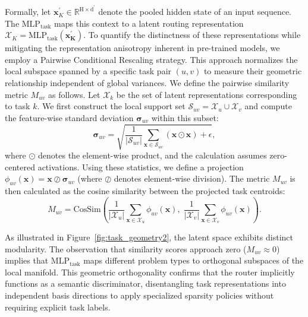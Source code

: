 Formally, let $\boldsymbol{x}_K^{\prime} \in \mathbb{R}^{\mathrm{H \times d^{\prime}}}$ denote the pooled hidden state of an input sequence. 
The $\text{MLP}_{\text{task}}$ maps this context to a latent routing representation $\mathcal{X}_K = \text{MLP}_{\text{task}}(\mathbf{\boldsymbol{x}_K^{\prime}})$. To quantify the distinctness of these representations while mitigating the representation anisotropy inherent in pre-trained models, we employ a Pairwise Conditional Rescaling strategy. This approach normalizes the local subspace spanned by a specific task pair $(u, v)$ to measure their geometric relationship independent of global variances.
We define the pairwise similarity metric $M_{uv}$ as follows. Let $\mathcal{X}_k$ be the set of latent representations corresponding to task $k$. 
We first construct the local support set $\mathcal{S}_{uv} = \mathcal{X}_u \cup \mathcal{X}_v$ and compute the feature-wise standard deviation $\boldsymbol{\sigma}_{uv}$ within this subset:
\begin{equation}
    \boldsymbol{\sigma}_{uv} = \sqrt{ \frac{1}{|\mathcal{S}_{uv}|} \sum_{\mathbf{x} \in \mathcal{S}_{uv}} (\mathbf{x} \odot \mathbf{x}) + \epsilon },
\end{equation}
where $\odot$ denotes the element-wise product, and the calculation assumes zero-centered activations.
Using these statistics, we define a projection $\phi_{uv}(\mathbf{x}) = \mathbf{x} \oslash \boldsymbol{\sigma}_{uv}$ (where $\oslash$ denotes element-wise division). 
The metric $M_{uv}$ is then calculated as the cosine similarity between the projected task centroids:
\begin{equation}
    M_{uv} = \mathrm{CosSim}\left( \frac{1}{|\mathcal{X}_u|} \sum_{\mathbf{x} \in \mathcal{X}_u} \phi_{uv}(\mathbf{x}), \; \frac{1}{|\mathcal{X}_v|} \sum_{\mathbf{x} \in \mathcal{X}_v} \phi_{uv}(\mathbf{x}) \right).
\end{equation}

As illustrated in Figure~\ref{fig:task_geometry2}, the latent space exhibits distinct modularity. The observation that similarity scores approach zero ($M_{uv} \approx 0$) implies that $\text{MLP}_{\text{task}}$ maps different problem types to orthogonal subspaces of the local manifold.  This geometric orthogonality confirms that the router implicitly functions as a semantic discriminator, disentangling task representations into independent basis directions to apply specialized sparsity policies without requiring explicit task labels.

